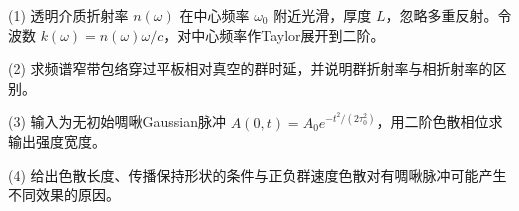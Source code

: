 (1) 透明介质折射率 \(n(\omega)\) 在中心频率 \(\omega_0\) 附近光滑，厚度 \(L\)，忽略多重反射。令波数 \(k(\omega)=n(\omega)\omega/c\)，对中心频率作Taylor展开到二阶。

(2) 求频谱窄带包络穿过平板相对真空的群时延，并说明群折射率与相折射率的区别。

(3) 输入为无初始啁啾Gaussian脉冲 \(A(0,t)=A_0e^{-t^2/(2\tau_0^2)}\)，用二阶色散相位求输出强度宽度。

(4) 给出色散长度、传播保持形状的条件与正负群速度色散对有啁啾脉冲可能产生不同效果的原因。
